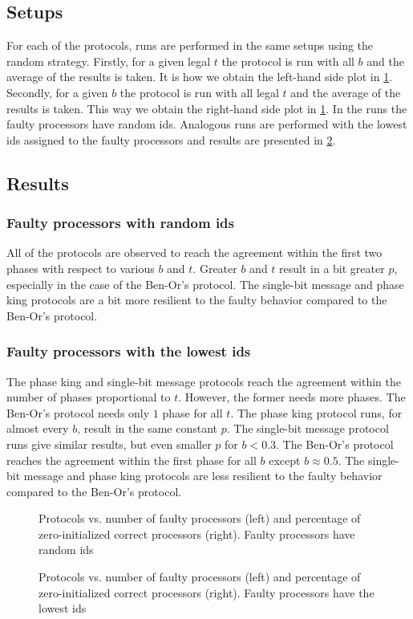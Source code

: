 \subsection{Setups}
For each of the protocols, runs are performed in the same setups using the random strategy. Firstly, for a given legal $t$ the protocol is run with all $b$ and the average of the results is taken. It is how we obtain the left-hand side plot in \cref{fig:plot2}. Secondly, for a given $b$ the protocol is run with all legal $t$ and the average of the results is taken. This way we obtain the right-hand side plot in \cref{fig:plot2}. In the runs the faulty processors have random ids. Analogous runs are performed with the lowest ids assigned to the faulty processors and results are presented in \cref{fig:plot3}.
\subsection{Results}
\subsubsection{Faulty processors with random ids} 
All of the protocols are observed to reach the agreement within the first two phases with respect to various $b$ and $t$. Greater $b$ and $t$ result in a bit greater $p$, especially in the case of the Ben-Or's protocol. The single-bit message and phase king protocols are a bit more resilient to the faulty behavior compared to the Ben-Or's protocol.
\subsubsection{Faulty processors with the lowest ids}
The phase king and single-bit message protocols reach the agreement within the number of phases proportional to $t$. However, the former needs more phases. The Ben-Or's protocol needs only $1$ phase for all $t$.
The phase king protocol runs, for almost every $b$, result in the same constant $p$. The single-bit message protocol runs give similar results, but even smaller $p$ for $b<0.3$. The Ben-Or's protocol reaches the agreement within the first phase for all $b$ except $b\approx0.5$.
The single-bit message and phase king protocols are less resilient to the faulty behavior compared to the Ben-Or's protocol.
\newpage
\begin{figure}[H]
    \caption{Protocols vs. number of faulty processors (left) and percentage of zero-initialized correct processors (right). Faulty processors have random ids }
    \begin{center}
        
    \end{center}\label{fig:plot2}
\end{figure}
\vspace*{-0.2in}
\begin{figure}[H]
    \caption{Protocols vs. number of faulty processors (left) and percentage of zero-initialized correct processors (right). Faulty processors have the lowest ids }
    \begin{center}
        
    \end{center}\label{fig:plot3}
\end{figure}

